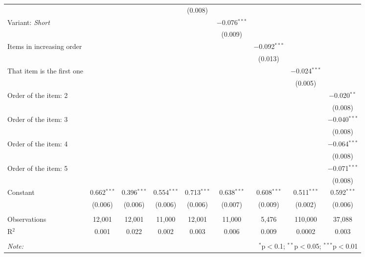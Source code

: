 \begin{tabular}{@{\extracolsep{5pt}}lcccccccc}
  &  &  &  & (0.008) &  &  &  &  \\ 
  Variant: \textit{Short} &  &  &  &  & $-$0.076$^{***}$ &  &  &  \\ 
  &  &  &  &  & (0.009) &  &  &  \\ 
  Items in increasing order &  &  &  &  &  & $-$0.092$^{***}$ &  &  \\ 
  &  &  &  &  &  & (0.013) &  &  \\ 
  That item is the first one &  &  &  &  &  &  & $-$0.024$^{***}$ &  \\ 
  &  &  &  &  &  &  & (0.005) &  \\ 
  Order of the item: 2 &  &  &  &  &  &  &  & $-$0.020$^{**}$ \\ 
  &  &  &  &  &  &  &  & (0.008) \\ 
  Order of the item: 3 &  &  &  &  &  &  &  & $-$0.040$^{***}$ \\ 
  &  &  &  &  &  &  &  & (0.008) \\ 
  Order of the item: 4 &  &  &  &  &  &  &  & $-$0.064$^{***}$ \\ 
  &  &  &  &  &  &  &  & (0.008) \\ 
  Order of the item: 5 &  &  &  &  &  &  &  & $-$0.071$^{***}$ \\ 
  &  &  &  &  &  &  &  & (0.008) \\ 
  Constant & 0.662$^{***}$ & 0.396$^{***}$ & 0.554$^{***}$ & 0.713$^{***}$ & 0.638$^{***}$ & 0.608$^{***}$ & 0.511$^{***}$ & 0.592$^{***}$ \\ 
  & (0.006) & (0.006) & (0.006) & (0.006) & (0.007) & (0.009) & (0.002) & (0.006) \\ 
 \hline \\[-1.8ex] 
Observations & 12,001 & 12,001 & 11,000 & 12,001 & 11,000 & 5,476 & 110,000 & 37,088 \\ 
R$^{2}$ & 0.001 & 0.022 & 0.002 & 0.003 & 0.006 & 0.009 & 0.0002 & 0.003 \\ 
\hline 
\hline \\[-1.8ex] 
\textit{Note:}  & \multicolumn{8}{r}{$^{*}$p$<$0.1; $^{**}$p$<$0.05; $^{***}$p$<$0.01} \\ 
\end{tabular} 
